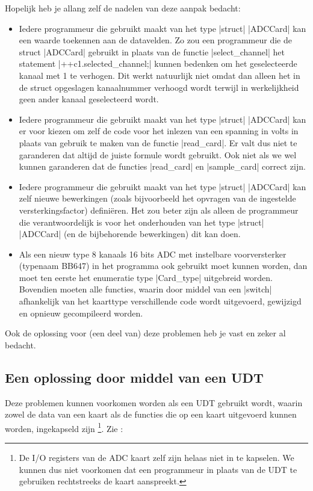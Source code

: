 \begin{cpplstShortInline}
Hopelijk heb je allang zelf de nadelen van deze aanpak bedacht:
\begin{itemize}
    \item Iedere programmeur die gebruikt maakt van het type |struct| |ADCCard| kan een waarde toekennen aan de datavelden.
    Zo zou een programmeur die de struct |ADCCard| gebruikt in plaats van de functie |select_channel| het statement |++c1.selected_channel;| kunnen bedenken om het geselecteerde kanaal met 1 te verhogen.
    Dit werkt natuurlijk niet omdat dan alleen het in de struct opgeslagen kanaalnummer verhoogd wordt terwijl in werkelijkheid geen ander kanaal geselecteerd wordt.
    \item Iedere programmeur die gebruikt maakt van het type |struct| |ADCCard| kan er voor kiezen om zelf de code voor het inlezen van een spanning in volts  in plaats van gebruik te maken van de functie |read_card|.
    Er valt dus niet te garanderen dat altijd de juiste formule wordt gebruikt.
    Ook niet als we wel kunnen garanderen dat de functies |read_card| en |sample_card| correct zijn.
    \item Iedere programmeur die gebruikt maakt van het type |struct| |ADCCard| kan zelf nieuwe bewerkingen (zoals bijvoorbeeld het opvragen van de ingestelde versterkingsfactor) definiëren.
    Het zou beter zijn als alleen de programmeur die verantwoordelijk is voor het onderhouden van het type |struct| |ADCCard| (en de bijbehorende bewerkingen) dit kan doen.
    \item Als een nieuw type 8 kanaals 16 bits ADC met instelbare voorversterker (typenaam BB647) in het programma ook gebruikt moet kunnen worden, dan moet ten eerste het enumeratie type |Card_type| uitgebreid worden.
    Bovendien moeten alle functies, waarin door middel van een |switch| afhankelijk van het kaarttype verschillende code wordt uitgevoerd, gewijzigd en opnieuw gecompileerd worden.
\end{itemize}

Ook de oplossing voor (een deel van) deze problemen heb je vast en zeker al bedacht.

\subsection{Een oplossing door middel van een UDT}
Deze problemen kunnen voorkomen worden als een UDT gebruikt wordt, waarin zowel de data van een kaart als de functies die op een kaart uitgevoerd kunnen worden, ingekapseld zijn%
\footnote{%
    De I/O registers van de ADC kaart zelf zijn helaas niet in te kapselen.
    We kunnen dus niet voorkomen dat een programmeur in plaats van de UDT  te gebruiken rechtstreeks de kaart aanspreekt.
}. Zie :


\end{cpplstShortInline}
